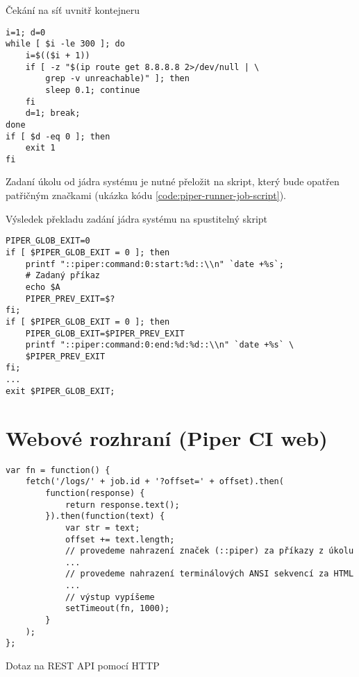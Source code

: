 \begin{listing}[ht]
\caption{\label{code:piper-runner-job-wait}Čekání na síť uvnitř kontejneru}
\begin{verbatim}
i=1; d=0
while [ $i -le 300 ]; do
    i=$(($i + 1))
    if [ -z "$(ip route get 8.8.8.8 2>/dev/null | \
        grep -v unreachable)" ]; then
        sleep 0.1; continue
    fi
    d=1; break;
done
if [ $d -eq 0 ]; then
    exit 1
fi
\end{verbatim}
\end{listing}

Zadaní úkolu od jádra systému je nutné přeložit na skript, který bude opatřen patřičným značkami (ukázka kódu \ref{code:piper-runner-job-script}).

\begin{listing}[ht]
\caption{\label{code:piper-runner-job-script}Výsledek překladu zadání jádra systému na spustitelný skript}
\begin{verbatim}
PIPER_GLOB_EXIT=0
if [ $PIPER_GLOB_EXIT = 0 ]; then
    printf "::piper:command:0:start:%d::\\n" `date +%s`;
    # Zadaný příkaz
    echo $A
    PIPER_PREV_EXIT=$?
fi;
if [ $PIPER_GLOB_EXIT = 0 ]; then
    PIPER_GLOB_EXIT=$PIPER_PREV_EXIT
    printf "::piper:command:0:end:%d:%d::\\n" `date +%s` \
    $PIPER_PREV_EXIT
fi;
...
exit $PIPER_GLOB_EXIT;
\end{verbatim}
\end{listing}

\section{Webové rozhraní (Piper CI web)}


\begin{listing}[ht]
\begin{verbatim}
var fn = function() {
    fetch('/logs/' + job.id + '?offset=' + offset).then(
        function(response) {
            return response.text();
        }).then(function(text) {
            var str = text;
            offset += text.length;
            // provedeme nahrazení značek (::piper) za příkazy z úkolu
            ...
            // provedeme nahrazení terminálových ANSI sekvencí za HTML
            ...
            // výstup vypíšeme
            setTimeout(fn, 1000);
        }
    );
};
\end{verbatim}
\caption{Dotaz na REST API pomocí HTTP}
\end{listing}


